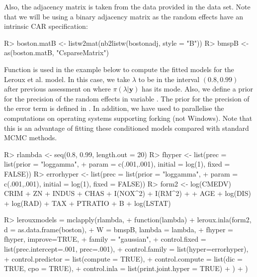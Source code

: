 \documentclass[article]{jss}
\begin{document}



Also, the adjacency matrix is taken from the data provided in the 
data set.
Note that we will be using a binary adjacency matrix as the random
effects have an intrinsic CAR specification:
\begin{Schunk}
\begin{Sinput}
R> boston.matB <- listw2mat(nb2listw(bostonadj, style = "B"))
R> bmspB <- as(boston.matB, "CsparseMatrix")
\end{Sinput}
\end{Schunk}

Function  is used in the example below to compute the fitted
models for the Leroux et al. model.  In this case, we take $\lambda$ to be in
the interval $(0.8,0.99)$ after previous assessment on where
$\pi(\lambda|\mathbf{y})$ has its mode. Also, we define a prior for the
precision of the random effects in variable .  The prior for the
precision of the error term is defined in . In addition, we
have used  to parallelise the computations on operating systems
supporting forking (not Windows). Note that this is an advantage of fitting
these conditioned models compared with standard MCMC methods.

\begin{Schunk}
\begin{Sinput}
R> rlambda <- seq(0.8, 0.99, length.out = 20)
R> fhyper <- list(prec = list(prior = "loggamma", 
+     param = c(.001,.001), initial = log(1), fixed = FALSE))
R> errorhyper <- list(prec = list(prior = "loggamma",
+     param = c(.001,.001), initial = log(1), fixed = FALSE))
R> form2 <- log(CMEDV) ~ CRIM + ZN + INDUS + CHAS + I(NOX^2) + I(RM^2) + 
+      AGE + log(DIS) + log(RAD) + TAX + PTRATIO + B + log(LSTAT)
\end{Sinput}
\end{Schunk}



\begin{Schunk}
\begin{Sinput}
R> lerouxmodels = mclapply(rlambda,
+          function(lambda) {
+                  leroux.inla(form2, d = as.data.frame(boston), 
+  		   W = bmspB, lambda = lambda,
+                     fhyper = fhyper, improve=TRUE,
+                     family = "gaussian",
+  		   control.fixed = list(prec.intercept=.001, prec=.001),
+  		   control.family = list(hyper=errorhyper),
+                     control.predictor = list(compute = TRUE),
+                     control.compute = list(dic = TRUE, cpo = TRUE),
+                     control.inla = list(print.joint.hyper = TRUE)
+                  )
+          })
\end{Sinput}
\end{Schunk}
\end{document}
